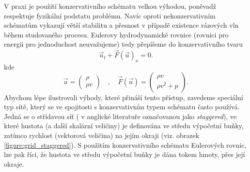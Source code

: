 V praxi je použití konzervativního schématu velkou výhodou, poněvadž respektuje fyzikální podstatu problému. Navíc oproti nekonzervativním schématům vykazují větší stabilitu a přesnost v případě existence rázových vln během studovaného procesu. Eulerovy hydrodynamické rovnice (rovnici pro energii pro jednoduchost neuvažujeme) tedy přepíšeme do konzervativního tvaru
\begin{equation}
\label{euler_conserve}
\vec{u}_t+\vec{F}(\vec{u})_{x} = 0.
\end{equation}
kde
\begin{equation}
\label{vector_form}
\vec{u} = \begin{pmatrix}
		\rho \\
		\rho v
		\end{pmatrix}\quad,\quad\vec{F}(\vec{u}) = \begin{pmatrix}
						\rho v \\
						\rho v^2 + p
					\end{pmatrix}.
\end{equation}
Abychom lépe ilustrovali výhody, které přináší tento přístup, zavedeme speciální typ sítě, který se ve spojitosti s konzervativním typem schématu často používá. Jedná se o střídavou síť ( v anglické literatuře označovanou jako {\it staggered}), ve které hustota (a další skalární veličiny) je definována ve středu výpočetní buňky, zatímco rychlost (vektorová veličina) na jejím okraji (viz. obrazek \ref{figure:grid_staggered}). S použitím konzervativního schématu Eulerových rovnic, lze pak říci, že hustota ve středu výpočetní buňky je dána tokem hmoty, přes její okraje.
